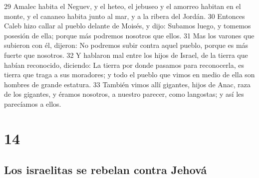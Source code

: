 29 Amalec habita el Neguev, y el heteo, el jebuseo y el amorreo habitan en el monte, y el cananeo habita junto al mar, y a la ribera del Jordán.
30 Entonces Caleb hizo callar al pueblo delante de Moisés, y dijo: Subamos luego, y tomemos posesión de ella; porque más podremos nosotros que ellos.
31 Mas los varones que subieron con él, dijeron: No podremos subir contra aquel pueblo, porque es más fuerte que nosotros.
32 Y hablaron mal entre los hijos de Israel, de la tierra que habían reconocido, diciendo: La tierra por donde pasamos para reconocerla, es tierra que traga a sus moradores; y todo el pueblo que vimos en medio de ella son hombres de grande estatura.
33 También vimos allí gigantes, hijos de Anac, raza de los gigantes, y éramos nosotros, a nuestro parecer, como langostas; y así les parecíamos a ellos.

\chapter{14}

\section*{Los israelitas se rebelan contra Jehová}

